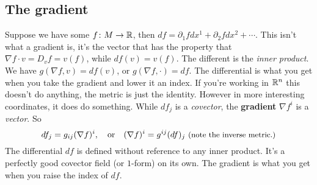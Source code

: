 \subsection{The gradient}
Suppose we have some $f \colon M \to \mathbb{R}$, then $df=\partial_1 f dx^1+\partial_2fdx^2+\cdots   $. This isn't what a gradient is, it's the vector that has the property that $\nabla f \cdot v=D_vf=v(f)$, while $df(v)=v(f)$. The different is the \emph{inner product}. We have $g(\nabla f,v)=df(v)$, or $g(\nabla f, \cdot )=df$. The differential is what you get when you take the gradient and lower it an index. If you're working in $\mathbb{R}^n $ this doesn't do anything, the metric is just the identity. However in more interesting coordinates, it does do something. While $df_j $ is a \emph{covector}, the \textbf{gradient} $\nabla f^i $ is a \emph{vector}. So \[
    df_j =g_{ij}(\nabla f)^i ,\quad \text{or} \quad(\nabla f)^i =g^{ij}(df)_j \ \text{\small (note the inverse metric.)} 
\] The differential $df$ is defined without reference to any inner product. It's a perfectly good covector field (or $1$-form) on its own. The gradient is what you get when you raise the index of $df$.

